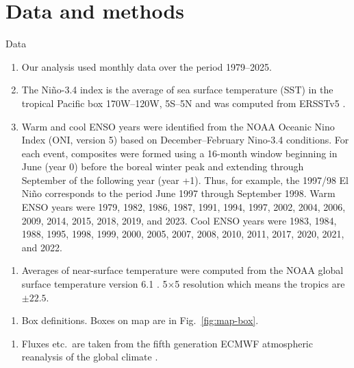 \documentclass[aspectratio=169,xcolor=dvipsnames]{beamer}
\begin{document}
\section{Data and methods}
\begin{frame}{Data}
  \begin{enumerate}\scriptsize
  \item Our analysis used monthly data over the period 1979--2025.
  \item The Ni\~no-3.4 index is the average of sea surface temperature
    (SST) in the tropical Pacific box  170\textdegree W--120\textdegree W,
    5\textdegree S--5\textdegree N \citep{Barnston1997} and was
    computed from ERSSTv5 \citep{Huang:ERSST5}.
  \item Warm and cool ENSO years were identified from the NOAA Oceanic
    Nino Index (ONI, version 5) based on December--February Nino-3.4
    conditions. For each event, composites were formed using a
    16-month window beginning in June (year 0) before the boreal
    winter peak and extending through September of the following year
    (year +1). Thus, for example, the 1997/98 El Ni\~no corresponds to
    the period June 1997 through September 1998. Warm ENSO years were
    1979, 1982, 1986, 1987, 1991, 1994, 1997, 2002, 2004, 2006, 2009,
    2014, 2015, 2018, 2019, and 2023. Cool ENSO years were 1983, 1984,
    1988, 1995, 1998, 1999, 2000, 2005, 2007, 2008, 2010, 2011, 2017,
    2020, 2021, and 2022.
  \end{enumerate}
  \begin{enumerate}    
  \item Averages of near-surface temperature were computed from the
    NOAA global surface temperature version 6.1
    \citep[NOAAGlobalTemp;][]{Huang2022improvements}. 5$\times$5
    resolution which means the tropics are $\pm 22.5$.
  \end{enumerate}
  \begin{enumerate}    
  \item Box definitions. Boxes on map are in Fig.\ \ref{fig:map-box}.
  \end{enumerate}
  \begin{enumerate}    
  \item Fluxes etc.\ are taken from the fifth generation ECMWF
    atmospheric reanalysis of the global climate
    \citep[ERA5;][]{Hersbach2020era5}.
  \end{enumerate}
\end{frame}
\end{document}

